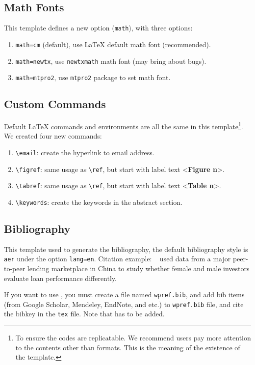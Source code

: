 \documentclass[11pt,en,cite=authoryear]{elegantpaper}
\begin{document}
\subsection{Math Fonts}

This template defines a new option (\lstinline{math}), with three options:

\begin{enumerate}
  \item \lstinline{math=cm} (default), use \LaTeX{} default math font (recommended).
  \item \lstinline{math=newtx}, use \lstinline{newtxmath} math font (may bring about bugs).
  \item \lstinline{math=mtpro2}, use \lstinline{mtpro2} package to set math font.
\end{enumerate}


\subsection{Custom Commands}
Default \LaTeX{} commands and environments are all the same in this template\footnote{To ensure the codes are replicatable. We recommend users pay more attention to the contents other than formats. This is the meaning of the existence of the template.}. We created four new commands:
\begin{enumerate}
  \item \lstinline{\email}: create the hyperlink to email address.
  \item \lstinline{\figref}: same usage as \lstinline{\ref}, but start with label text <\textbf{Figure n}>.
  \item \lstinline{\tabref}: same usage as \lstinline{\ref}, but start with label text <\textbf{Table n}>.
  \item \lstinline{\keywords}: create the keywords in the abstract section.
\end{enumerate}


\subsection{Bibliography}
This template used  to generate the bibliography, the default bibliography style is  \lstinline{aer} under the option \lstinline{lang=en}. Citation example: ~\citep{en1,en2,en3} used data from a major peer-to-peer lending marketplace in China to study whether female and male investors evaluate loan performance differently. 

If you want to use , you must create a file named \lstinline{wpref.bib}, and add bib items (from Google Scholar, Mendeley, EndNote, and etc.) to \lstinline{wpref.bib} file, and cite the bibkey in the \lstinline{tex} file. Note that  has to be added.
\end{document}
